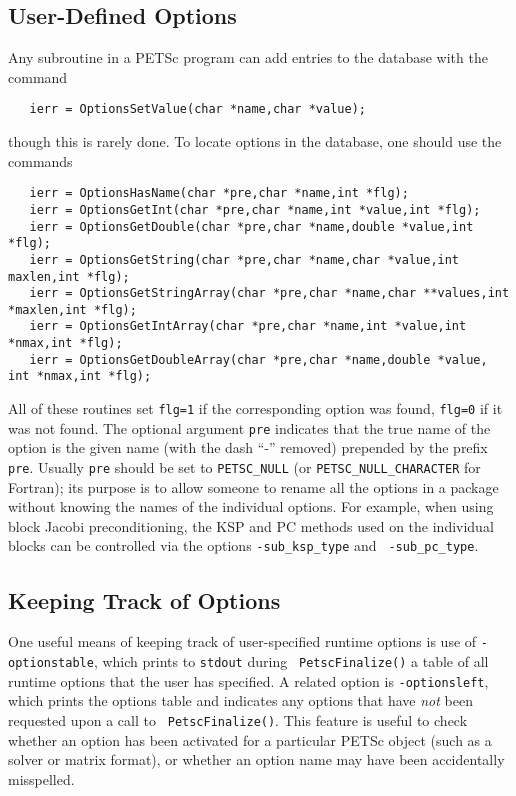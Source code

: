 {\subsection{User-Defined Options}

Any subroutine in a PETSc program can add entries to the database with the 
command 
\begin{verbatim}
   ierr = OptionsSetValue(char *name,char *value);
\end{verbatim}
though this is rarely done.
To locate options in the database, one should use the
commands  
\begin{verbatim}
   ierr = OptionsHasName(char *pre,char *name,int *flg);
   ierr = OptionsGetInt(char *pre,char *name,int *value,int *flg);
   ierr = OptionsGetDouble(char *pre,char *name,double *value,int *flg);
   ierr = OptionsGetString(char *pre,char *name,char *value,int maxlen,int *flg);
   ierr = OptionsGetStringArray(char *pre,char *name,char **values,int *maxlen,int *flg);
   ierr = OptionsGetIntArray(char *pre,char *name,int *value,int *nmax,int *flg);
   ierr = OptionsGetDoubleArray(char *pre,char *name,double *value, int *nmax,int *flg);
\end{verbatim}
All 
of  
these 
routines set {\tt flg=1} if the corresponding option was found, {\tt flg=0} if it
was not found.  The optional argument
{\tt pre} indicates that the true name of the option is the given name
(with the dash ``-'' removed) prepended by the prefix {\tt pre}.
Usually {\tt pre} should be set to {\tt PETSC\_NULL} (or {\tt PETSC\_NULL\_CHARACTER}
for Fortran); its purpose is to
allow someone to rename all the options in a package without knowing
the names of the individual options.  For example, when using block
Jacobi preconditioning, the KSP and PC methods used on the individual
blocks can be controlled via the options {\tt -sub\_ksp\_type} and {\tt
-sub\_pc\_type}. 

\subsection{Keeping Track of Options}

One useful means of keeping track of user-specified runtime options is
use of {\tt -optionstable}, which prints to {\tt stdout} during {\tt
PetscFinalize()} a table of all runtime options that the user has
specified.   A related option is {\tt -optionsleft},
 which prints the options table and indicates
any options that have {\em not} been requested upon a call to {\tt
PetscFinalize()}.  This feature is useful to check whether an option
has been activated for a particular PETSc object (such as a solver or
matrix format), or whether an option name may have been accidentally
misspelled.

}
